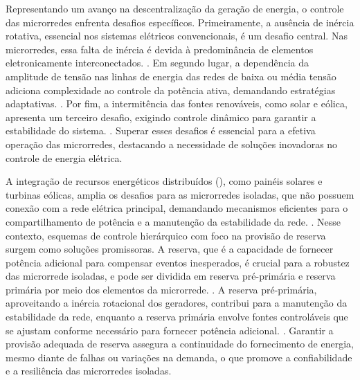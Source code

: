 Representando um avanço na descentralização da geração de energia, o controle das microrredes enfrenta desafios específicos. Primeiramente, a ausência de inércia rotativa, essencial nos sistemas elétricos convencionais, é um desafio central. Nas microrredes, essa falta de inércia é devida à predominância de elementos eletronicamente interconectados. \cite{Paigi2013}. Em segundo lugar, a dependência da amplitude de tensão nas linhas de energia das redes de baixa ou média tensão adiciona complexidade ao controle da potência ativa, demandando estratégias adaptativas. \cite{Paigi2013}. Por fim, a intermitência das fontes renováveis, como solar e eólica, apresenta um terceiro desafio, exigindo controle dinâmico para garantir a estabilidade do sistema. \cite{Paigi2013}. Superar esses desafios é essencial para a efetiva operação das microrredes, destacando a necessidade de soluções inovadoras no controle de energia elétrica.

A integração de recursos energéticos distribuídos (), como painéis solares e turbinas eólicas, amplia os desafios para as microrredes isoladas, que não possuem conexão com a rede elétrica principal, demandando mecanismos eficientes para o compartilhamento de potência e a manutenção da estabilidade da rede. \cite{Paigi2013}. Nesse contexto, esquemas de controle hierárquico com foco na provisão de reserva surgem como soluções promissoras. A reserva, que é a capacidade de fornecer potência adicional para compensar eventos inesperados, é crucial para a robustez das microrrede isoladas, e pode ser dividida em reserva pré-primária e reserva primária por meio dos elementos da microrrede. \cite{Paigi2013}. A reserva pré-primária, aproveitando a inércia rotacional dos geradores, contribui para a manutenção da estabilidade da rede, enquanto a reserva primária envolve fontes controláveis que se ajustam conforme necessário para fornecer potência adicional. \cite{Paigi2013}. Garantir a provisão adequada de reserva assegura a continuidade do fornecimento de energia, mesmo diante de falhas ou variações na demanda, o que promove a confiabilidade e a resiliência das microrredes isoladas.

